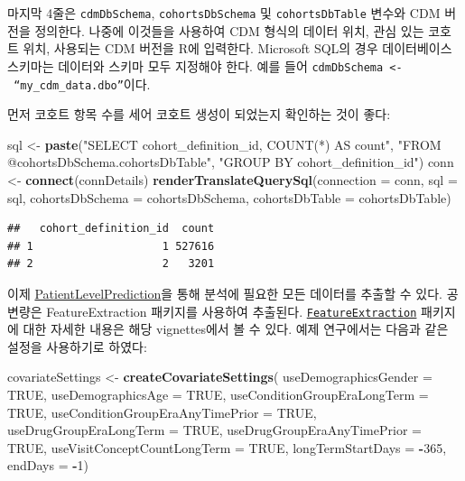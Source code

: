 \documentclass[11pt]{book}
\newenvironment{Shaded}{\begin{snugshade}}{\end{snugshade}}
\newcommand{\KeywordTok}[1]{\textcolor[rgb]{0.13,0.29,0.53}{\textbf{#1}}}
\newcommand{\DataTypeTok}[1]{\textcolor[rgb]{0.13,0.29,0.53}{#1}}
\newcommand{\DecValTok}[1]{\textcolor[rgb]{0.00,0.00,0.81}{#1}}
\newcommand{\StringTok}[1]{\textcolor[rgb]{0.31,0.60,0.02}{#1}}
\newcommand{\OtherTok}[1]{\textcolor[rgb]{0.56,0.35,0.01}{#1}}
\newcommand{\OperatorTok}[1]{\textcolor[rgb]{0.81,0.36,0.00}{\textbf{#1}}}
\newcommand{\NormalTok}[1]{#1}
\theoremstyle{definition}
\theoremstyle{definition}
\theoremstyle{definition}
\theoremstyle{remark}
\begin{document}
마지막 4줄은 \texttt{cdmDbSchema}, \texttt{cohortsDbSchema} 및
\texttt{cohortsDbTable} 변수와 CDM 버전을 정의한다. 나중에 이것들을
사용하여 CDM 형식의 데이터 위치, 관심 있는 코호트 위치, 사용되는 CDM
버전을 R에 입력한다. Microsoft SQL의 경우 데이터베이스 스키마는 데이터와
스키마 모두 지정해야 한다. 예를 들어
\texttt{cdmDbSchema\ \textless{}-\ “my\_cdm\_data.dbo”}이다.

먼저 코호트 항목 수를 세어 코호트 생성이 되었는지 확인하는 것이 좋다:

\begin{Shaded}
\begin{Highlighting}[]
\NormalTok{sql <-}\StringTok{ }\KeywordTok{paste}\NormalTok{(}\StringTok{"SELECT cohort_definition_id, COUNT(*) AS count"}\NormalTok{,}
\StringTok{"FROM @cohortsDbSchema.cohortsDbTable"}\NormalTok{,}
\StringTok{"GROUP BY cohort_definition_id"}\NormalTok{)}
\NormalTok{conn <-}\StringTok{ }\KeywordTok{connect}\NormalTok{(connDetails)}
\KeywordTok{renderTranslateQuerySql}\NormalTok{(}\DataTypeTok{connection =}\NormalTok{ conn, }
                        \DataTypeTok{sql =}\NormalTok{ sql,}
                        \DataTypeTok{cohortsDbSchema =}\NormalTok{ cohortsDbSchema,}
                        \DataTypeTok{cohortsDbTable =}\NormalTok{ cohortsDbTable)}
\end{Highlighting}
\end{Shaded}

\begin{verbatim}
##   cohort_definition_id  count
## 1                    1 527616
## 2                    2   3201
\end{verbatim}

이제
\href{https://ohdsi.github.io/PatientLevelPrediction/}{PatientLevelPrediction}을
통해 분석에 필요한 모든 데이터를 추출할 수 있다. 공변량은
FeatureExtraction 패키지를 사용하여 추출된다.
\href{https://ohdsi.github.io/FeatureExtraction/}{\texttt{FeatureExtraction}}
패키지에 대한 자세한 내용은 해당 vignettes에서 볼 수 있다. 예제
연구에서는 다음과 같은 설정을 사용하기로 하였다:

\begin{Shaded}
\begin{Highlighting}[]
\NormalTok{covariateSettings <-}\StringTok{ }\KeywordTok{createCovariateSettings}\NormalTok{(}
\DataTypeTok{useDemographicsGender =} \OtherTok{TRUE}\NormalTok{,}
                          \DataTypeTok{useDemographicsAge =} \OtherTok{TRUE}\NormalTok{,}
                          \DataTypeTok{useConditionGroupEraLongTerm =} \OtherTok{TRUE}\NormalTok{,}
                          \DataTypeTok{useConditionGroupEraAnyTimePrior =} \OtherTok{TRUE}\NormalTok{,}
                          \DataTypeTok{useDrugGroupEraLongTerm =} \OtherTok{TRUE}\NormalTok{,}
                          \DataTypeTok{useDrugGroupEraAnyTimePrior =} \OtherTok{TRUE}\NormalTok{,}
                          \DataTypeTok{useVisitConceptCountLongTerm =} \OtherTok{TRUE}\NormalTok{,}
                          \DataTypeTok{longTermStartDays =} \OperatorTok{-}\DecValTok{365}\NormalTok{,}
                          \DataTypeTok{endDays =} \OperatorTok{-}\DecValTok{1}\NormalTok{)}
\end{Highlighting}
\end{Shaded}
\end{document}
